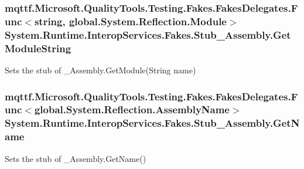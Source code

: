 \hypertarget{class_system_1_1_runtime_1_1_interop_services_1_1_fakes_1_1_stub___assembly_a3ca816fbe3bd104ffb34d2e4a74aff5b}{
\subsubsection[{Get\-Module\-String}]{\setlength{\rightskip}{0pt plus 5cm}mqttf.\-Microsoft.\-Quality\-Tools.\-Testing.\-Fakes.\-Fakes\-Delegates.\-Func$<$string, global.\-System.\-Reflection.\-Module$>$ System.\-Runtime.\-Interop\-Services.\-Fakes.\-Stub\-\_\-\-Assembly.\-Get\-Module\-String}}\label{class_system_1_1_runtime_1_1_interop_services_1_1_fakes_1_1_stub___assembly_a3ca816fbe3bd104ffb34d2e4a74aff5b}


Sets the stub of \-\_\-\-Assembly.\-Get\-Module(\-String name)

\hypertarget{class_system_1_1_runtime_1_1_interop_services_1_1_fakes_1_1_stub___assembly_aebbad2f4aec00b39738f35f8a3b69eb6}{
\subsubsection[{Get\-Name}]{\setlength{\rightskip}{0pt plus 5cm}mqttf.\-Microsoft.\-Quality\-Tools.\-Testing.\-Fakes.\-Fakes\-Delegates.\-Func$<$global.\-System.\-Reflection.\-Assembly\-Name$>$ System.\-Runtime.\-Interop\-Services.\-Fakes.\-Stub\-\_\-\-Assembly.\-Get\-Name}}\label{class_system_1_1_runtime_1_1_interop_services_1_1_fakes_1_1_stub___assembly_aebbad2f4aec00b39738f35f8a3b69eb6}


Sets the stub of \-\_\-\-Assembly.\-Get\-Name()

